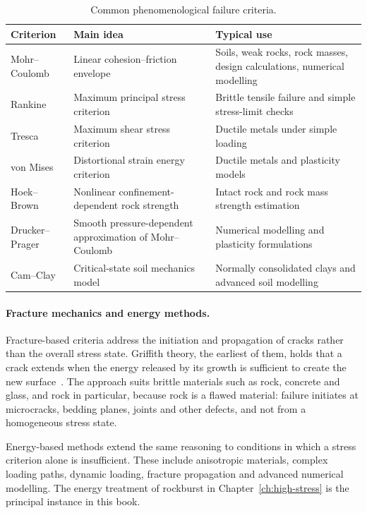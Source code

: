 \begin{table}[htbp]
\caption{Common phenomenological failure criteria.}
\label{tab:phenomenological_criteria}
\centering
\small
\begin{tabularx}{\textwidth}{l Y Y}
\toprule
\textbf{Criterion} & \textbf{Main idea} & \textbf{Typical use} \\
\midrule
Mohr--Coulomb & Linear cohesion--friction envelope & Soils, weak rocks, rock masses, design calculations, numerical modelling \\
Rankine & Maximum principal stress criterion & Brittle tensile failure and simple stress-limit checks \\
Tresca & Maximum shear stress criterion & Ductile metals under simple loading \\
von Mises & Distortional strain energy criterion & Ductile metals and plasticity models \\
Hoek--Brown & Nonlinear confinement-dependent rock strength & Intact rock and rock mass strength estimation \\
Drucker--Prager & Smooth pressure-dependent approximation of Mohr--Coulomb & Numerical modelling and plasticity formulations \\
Cam--Clay & Critical-state soil mechanics model & Normally consolidated clays and advanced soil modelling \\
\bottomrule
\end{tabularx}
\end{table}

\paragraph{Fracture mechanics and energy methods.}
Fracture-based criteria address the initiation and propagation of cracks
rather than the overall stress state. Griffith theory, the earliest of them,
holds that a crack extends when the energy released by its growth is
sufficient to create the new surface~\citep{griffith1921rupture}. The approach
suits brittle materials such as rock, concrete and glass, and rock in
particular, because rock is a flawed material: failure initiates at
microcracks, bedding planes, joints and other defects, and not from a
homogeneous stress state.

Energy-based methods extend the same reasoning to conditions in which a
stress criterion alone is insufficient. These include anisotropic materials,
complex loading paths, dynamic loading, fracture propagation and advanced
numerical modelling. The energy treatment of rockburst in
Chapter~\ref{ch:high-stress} is the principal instance in this book.

